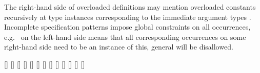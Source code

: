 \begin{isabellebody}
\begin{isamarkuptext}
\begin{itemize}
  \end{itemize}

  The right-hand side of overloaded definitions may mention overloaded constants
  recursively at type instances corresponding to the immediate
  argument types .  Incomplete
  specification patterns impose global constraints on all occurrences,
  e.g.\  on the left-hand side means that all
  corresponding occurrences on some right-hand side need to be an
  instance of this, general  will be disallowed.

  \begin{railoutput}
[]
\rail@plus
{}[]
[]
[]
\rail@bar
{}
[]
\rail@endbar
{}
\rail@endplus
\rail@end
{}
[]
\rail@bar
{}
[]
\rail@endbar
\rail@plus
{}[]
[]
\rail@endplus
\rail@end
{}
[]
\rail@bar
{}
[]
\rail@endbar
\rail@bar
{}
[]
\rail@endbar
{}[]
\rail@end
\end{railoutput}



\end{isamarkuptext}
\end{isabellebody}
